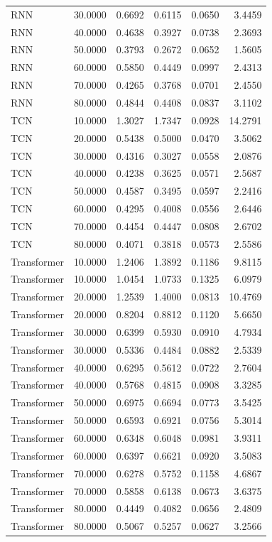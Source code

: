 \begin{tabular}{lrrrrr}
RNN & 30.0000 & 0.6692 & 0.6115 & 0.0650 & 3.4459 \\
RNN & 40.0000 & 0.4638 & 0.3927 & 0.0738 & 2.3693 \\
RNN & 50.0000 & 0.3793 & 0.2672 & 0.0652 & 1.5605 \\
RNN & 60.0000 & 0.5850 & 0.4449 & 0.0997 & 2.4313 \\
RNN & 70.0000 & 0.4265 & 0.3768 & 0.0701 & 2.4550 \\
RNN & 80.0000 & 0.4844 & 0.4408 & 0.0837 & 3.1102 \\
TCN & 10.0000 & 1.3027 & 1.7347 & 0.0928 & 14.2791 \\
TCN & 20.0000 & 0.5438 & 0.5000 & 0.0470 & 3.5062 \\
TCN & 30.0000 & 0.4316 & 0.3027 & 0.0558 & 2.0876 \\
TCN & 40.0000 & 0.4238 & 0.3625 & 0.0571 & 2.5687 \\
TCN & 50.0000 & 0.4587 & 0.3495 & 0.0597 & 2.2416 \\
TCN & 60.0000 & 0.4295 & 0.4008 & 0.0556 & 2.6446 \\
TCN & 70.0000 & 0.4454 & 0.4447 & 0.0808 & 2.6702 \\
TCN & 80.0000 & 0.4071 & 0.3818 & 0.0573 & 2.5586 \\
Transformer & 10.0000 & 1.2406 & 1.3892 & 0.1186 & 9.8115 \\
Transformer & 10.0000 & 1.0454 & 1.0733 & 0.1325 & 6.0979 \\
Transformer & 20.0000 & 1.2539 & 1.4000 & 0.0813 & 10.4769 \\
Transformer & 20.0000 & 0.8204 & 0.8812 & 0.1120 & 5.6650 \\
Transformer & 30.0000 & 0.6399 & 0.5930 & 0.0910 & 4.7934 \\
Transformer & 30.0000 & 0.5336 & 0.4484 & 0.0882 & 2.5339 \\
Transformer & 40.0000 & 0.6295 & 0.5612 & 0.0722 & 2.7604 \\
Transformer & 40.0000 & 0.5768 & 0.4815 & 0.0908 & 3.3285 \\
Transformer & 50.0000 & 0.6975 & 0.6694 & 0.0773 & 3.5425 \\
Transformer & 50.0000 & 0.6593 & 0.6921 & 0.0756 & 5.3014 \\
Transformer & 60.0000 & 0.6348 & 0.6048 & 0.0981 & 3.9311 \\
Transformer & 60.0000 & 0.6397 & 0.6621 & 0.0920 & 3.5083 \\
Transformer & 70.0000 & 0.6278 & 0.5752 & 0.1158 & 4.6867 \\
Transformer & 70.0000 & 0.5858 & 0.6138 & 0.0673 & 3.6375 \\
Transformer & 80.0000 & 0.4449 & 0.4082 & 0.0656 & 2.4809 \\
Transformer & 80.0000 & 0.5067 & 0.5257 & 0.0627 & 3.2566 \\
\bottomrule
\end{tabular}
